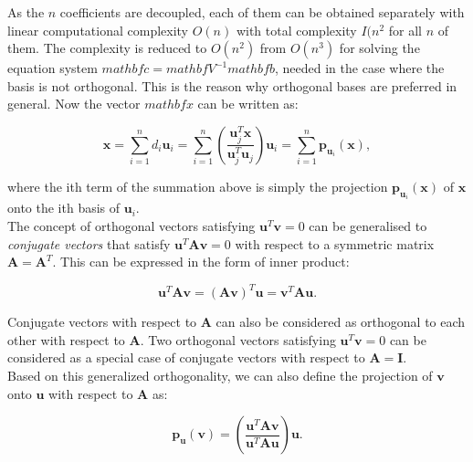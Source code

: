 \documentclass[10pt,b5paper,titlepage]{book}
\begin{document}
As the $n$ coefficients are decoupled, each of them can be obtained separately
with linear computational complexity $O(n)$ with total complexity  $I(n^{2}$
for all $n$ of them. The complexity is reduced to $O(n^{2})$ from $O(n^{3})$
for solving the equation system $mathbf{c} = mathbf{V}^{-1}mathbf{b}$, needed in the case
where the basis is not orthogonal. This is the reason why orthogonal bases are
preferred in general. Now the vector $mathbf{x}$ can be written as:

\begin{equation}
    \mathbf{x} = \sum_{i=1}^{n} d_{i} \mathbf{u}_{i}
    = \sum_{i=1}^{n} \left(
    \frac{\mathbf{u}_{j}^{T}\mathbf{x}}{\mathbf{u}_{j}^{T}\mathbf{u}_{j}}
    \right) \mathbf{u}_{i}
    = \sum_{i=1}^{n} \mathbf{p}_{\mathbf{u}_{i}}(\mathbf{x})
,\end{equation}

where the ith term of the summation above is simply the projection
$\mathbf{p}_{\mathbf{u}_{i}}(\mathbf{x})$ of $\mathbf{x}$ onto the ith basis of $\mathbf{u}_{i}$.\\

The concept of orthogonal vectors satisfying $\mathbf{u}^{T}\mathbf{v} = 0$
can be generalised to \textit{conjugate vectors} that satisfy
$\mathbf{u}^{T}\mathbf{A}\mathbf{v} = 0$ with respect to a symmetric matrix
$\mathbf{A} = \mathbf{A}^{T}$. This can be expressed in the form of inner product:

\begin{equation}
    \mathbf{u}^{T} \mathbf{A} \mathbf{v}
    = (\mathbf{A}\mathbf{v})^{T}\mathbf{u}
    = \mathbf{v}^{T}\mathbf{A}\mathbf{u}
.\end{equation}

Conjugate vectors with respect to $\mathbf{A}$ can also be considered as orthogonal
to each other with respect to $\mathbf{A}$. Two orthogonal vectors satisfying
$\mathbf{u}^{T}\mathbf{v} = 0$ can be considered as a special case of conjugate
vectors with respect to $\mathbf{A} = \mathbf{I}$.\\

Based on this generalized orthogonality, we can also define the projection of
$\mathbf{v}$ onto $\mathbf{u}$ with respect to $\mathbf{A}$ as:

\begin{equation}
    \mathbf{p}_{\mathbf{u}}(\mathbf{v}) = \left(
    \frac{\mathbf{u}^{T}\mathbf{A}\mathbf{v}}{\mathbf{u}^{T}\mathbf{A}\mathbf{u}}
    \right) \mathbf{u}
.\end{equation}
\end{document}
